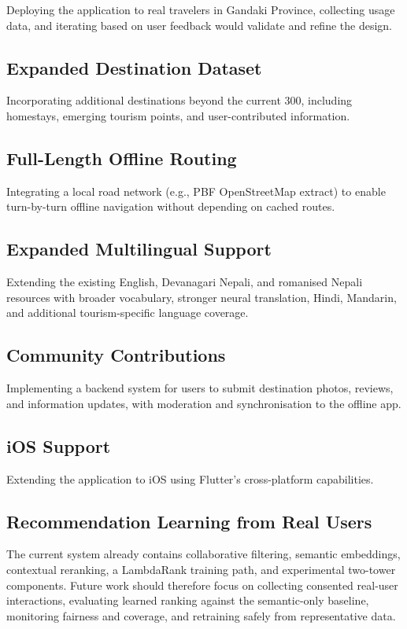 \documentclass[12pt,a4paper,oneside]{report}
\begin{document}
Deploying the application to real travelers in Gandaki Province, collecting usage data, and iterating based on user feedback would validate and refine the design.

\subsection{Expanded Destination Dataset}

Incorporating additional destinations beyond the current 300, including homestays, emerging tourism points, and user-contributed information.

\subsection{Full-Length Offline Routing}

Integrating a local road network (e.g., PBF OpenStreetMap extract) to enable turn-by-turn offline navigation without depending on cached routes.

\subsection{Expanded Multilingual Support}

Extending the existing English, Devanagari Nepali, and romanised Nepali resources with broader vocabulary, stronger neural translation, Hindi, Mandarin, and additional tourism-specific language coverage.

\subsection{Community Contributions}

Implementing a backend system for users to submit destination photos, reviews, and information updates, with moderation and synchronisation to the offline app.

\subsection{iOS Support}

Extending the application to iOS using Flutter's cross-platform capabilities.

\subsection{Recommendation Learning from Real Users}

The current system already contains collaborative filtering, semantic embeddings, contextual reranking, a LambdaRank training path, and experimental two-tower components. Future work should therefore focus on collecting consented real-user interactions, evaluating learned ranking against the semantic-only baseline, monitoring fairness and coverage, and retraining safely from representative data.
\end{document}
